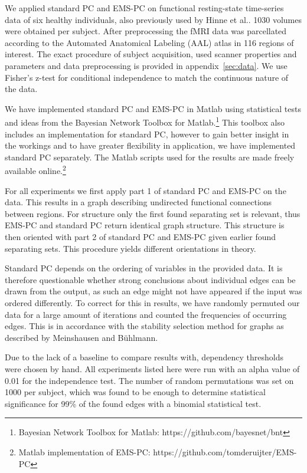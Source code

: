 \documentclass[a4paper, 10pt, english, onecolumn]{article}
\begin{document}
We applied standard PC and EMS-PC on functional resting-state time-series data of six healthy individuals, also previously used by Hinne et al.\cite{hinne2013}.
1030 volumes were obtained per subject.
After preprocessing the fMRI data was parcellated according to the Automated Anatomical Labeling (AAL) atlas in 116 regions of interest.
The exact procedure of subject acquisition, used scanner properties and parameters and data preprocessing is provided in appendix~\ref{sec:data}.
We use Fisher's z-test for conditional independence to match the continuous nature of the data.

We have implemented standard PC and EMS-PC in Matlab using statistical tests and ideas from the Bayesian Network Toolbox for Matlab.\footnote{Bayesian Network Toolbox for Matlab: https://github.com/bayesnet/bnt}
This toolbox also includes an implementation for standard PC, however to gain better insight in the workings and to have greater flexibility in application, we have implemented standard PC separately.
The Matlab scripts used for the results are made freely available online.\footnote{Matlab implementation of EMS-PC: https://github.com/tomderuijter/EMS-PC}

For all experiments we first apply part 1 of standard PC and EMS-PC on the data.
This results in a graph describing undirected functional connections between regions.
For structure only the first found separating set is relevant, thus EMS-PC and standard PC return identical graph structure.
This structure is then oriented with part 2 of standard PC and EMS-PC given earlier found separating sets.
This procedure yields different orientations in theory.

Standard PC depends on the ordering of variables in the provided data\cite[p.120-122]{spirtes2000}.
It is therefore questionable whether strong conclusions about individual edges can be drawn from the output, as such an edge might not have appeared if the input was ordered differently.
To correct for this in results, we have randomly permuted our data for a large amount of iterations and counted the frequencies of occurring edges.
This is in accordance with the stability selection method for graphs as described by Meinshausen and B{\"u}hlmann\cite{meinshausen2010}.

Due to the lack of a baseline to compare results with, dependency thresholds were chosen by hand.
All experiments listed here were run with an alpha value of 0.01 for the independence test.
The number of random permutations was set on 1000 per subject, which was found to be enough to determine statistical significance for 99\% of the found edges with a binomial statistical test.
\end{document}
